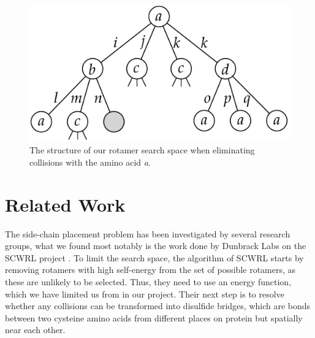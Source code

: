 \begin{figure}
	\centering
	\includegraphics[width=.9\columnwidth]{figures/rotamersearch}
	\caption{The structure of our rotamer search space when eliminating
      collisions with the amino acid \textit{a}.}
    \label{fig:rotamer-search-tree}
\end{figure}

\section{Related Work}
The side-chain placement problem has been investigated by several
research groups, what we found most notably is the work done by
Dunbrack Labs on the SCWRL project \cite{canutescu2003graph,
  krivov2009improved}. To limit the search space, the algorithm of
SCWRL starts by removing rotamers with high self-energy from the set
of possible rotamers, as these are unlikely to be selected. Thus, they
need to use an energy function, which we have limited us from in our
project. Their next step is to resolve whether any collisions can be
transformed into disulfide bridges, which are bonds between two cysteine
amino acids from different places on protein but spatially near each
other.






